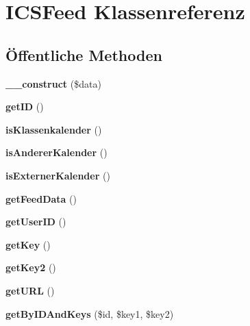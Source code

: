 \hypertarget{class_i_c_s_feed}{}\section{I\+C\+S\+Feed Klassenreferenz}
\label{class_i_c_s_feed}
\subsection*{Öffentliche Methoden}
\begin{DoxyCompactItemize}
\item 
\mbox{\label{class_i_c_s_feed_a50343c466d92bb044fbfe28a25823ce6}} 
{\bfseries \+\_\+\+\_\+construct} (\$data)
\item 
\mbox{\label{class_i_c_s_feed_a292f15faf3787995ff3d1a02012c5b88}} 
{\bfseries get\+ID} ()
\item 
\mbox{\label{class_i_c_s_feed_ad07e4459be7db71afa62753b040581bc}} 
{\bfseries is\+Klassenkalender} ()
\item 
\mbox{\label{class_i_c_s_feed_acd9070ab3afe613512d03cb038d9eb91}} 
{\bfseries is\+Anderer\+Kalender} ()
\item 
\mbox{\label{class_i_c_s_feed_aa4c9f9dfff98783867e34217267255dc}} 
{\bfseries is\+Externer\+Kalender} ()
\item 
\mbox{\label{class_i_c_s_feed_afe40b9588df998a0bd71532e558c91c1}} 
{\bfseries get\+Feed\+Data} ()
\item 
\mbox{\label{class_i_c_s_feed_a2c77013230ddfaec2d77004eaaca366a}} 
{\bfseries get\+User\+ID} ()
\item 
\mbox{\label{class_i_c_s_feed_a6f3f9c1260f5c9f65c7ba8264463b981}} 
{\bfseries get\+Key} ()
\item 
\mbox{\label{class_i_c_s_feed_aa7eac48ffeb790d2bba79d4c22cff8b7}} 
{\bfseries get\+Key2} ()
\item 
\mbox{\label{class_i_c_s_feed_afd8fc02639c8fe1827bd3d1038327cd1}} 
{\bfseries get\+U\+RL} ()
\item 
\mbox{\label{class_i_c_s_feed_a30cfd67d8bf3415f57728793bef5dfe8}} 
{\bfseries get\+By\+I\+D\+And\+Keys} (\$id, \$key1, \$key2)
\end{DoxyCompactItemize}

